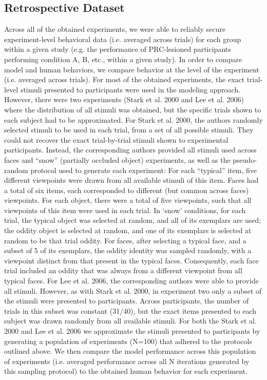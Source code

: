 \documentclass[11pt]{article}
\begin{document}
\subsection{Retrospective Dataset}

Across all of the obtained experiments, we were able to reliably secure experiment-level behavioral data (i.e. averaged across trials) for each group within a given study (e.g. the performance of PRC-lesioned participants performing condition A, B, etc., within a given study). In order to compare model and human behaviors, we compare behavior at the level of the experiment (i.e. averaged across trials). For most of the obtained experiments, the exact trial-level stimuli presented to participants were used in the modeling approach. However, there were two experiments (Stark et al. 2000 and Lee et al. 2006) where the distribution of all stimuli was obtained, but the specific trials shown to each subject had to be approximated. For Stark et al. 2000, the authors randomly selected stimuli to be used in each trial, from a set of all possible stimuli. They could not recover the exact trial-by-trial stimuli shown to experimental participants. Instead, the corresponding authors provided all stimuli used across faces and “snow” (partially occluded object) experiments, as well as the pseudo-random protocol used to generate each experiment: For each “typical” item, five different viewpoints were drawn from all available stimuli of this item. Faces had a total of six items, each corresponded to different (but common across faces) viewpoints. For each object, there were a total of five viewpoints, such that all viewpoints of this item were used in each trial. In `snow' conditions, for each trial, the typical object was selected at random, and all of its exemplars are used; the oddity object is selected at random, and one of its exemplars is selected at random to be that trial oddity. For faces, after selecting a typical face, and a subset of 5 of its exemplars, the oddity identity was sampled randomly, with a viewpoint distinct from that present in the typical faces. Consequently, each face trial included an oddity that was always from a different viewpoint from all typical faces. For Lee et al. 2006, the corresponding authors were able to provide all stimuli. However, as with Stark et al. 2000, in experiment two only a subset of the stimuli were presented to participants. Across participants, the number of trials in this subset was constant (31/40), but the exact items presented to each subject was drawn randomly from all available stimuli. For both the Stark et al. 2000 and Lee et al. 2006 we approximate the stimuli presented to participants by generating a population of experiments (N=100) that adhered to the protocols outlined above. We then compare the model performance across this population of experiments (i.e. averaged performance across all N iterations generated by this sampling protocol) to the obtained human behavior for each experiment.
\end{document}
